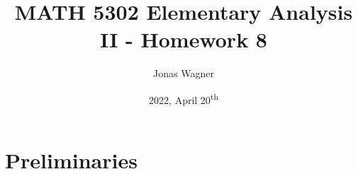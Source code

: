 \documentclass[]{article}
\title{MATH 5302 Elementary Analysis II - Homework 8}
\author{Jonas Wagner}
\date{2022, April 20\textsuperscript{th}}
\newcommand{\R}{\mathbb{R}}
\newtheorem{definition}{Definition}
\begin{document}
\maketitle

\tableofcontents

\newpage
\section*{Preliminaries}

\end{document}
